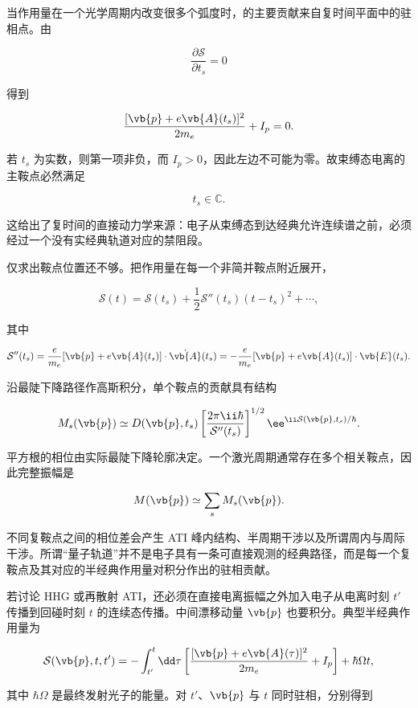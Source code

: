 当作用量在一个光学周期内改变很多个弧度时，的主要贡献来自复时间平面中的驻相点。由

\[
\frac{\partial \mathcal S}{\partial t_s}=0
\]

得到

\begin{equation}
\frac{[\vb{p}+e\vb{A}(t_s)]^2}{2m_e}+I_p=0.
\label{eq:sfa-saddle}
\end{equation}

若 \(t_s\) 为实数，则第一项非负，而 \(I_p>0\)，因此左边不可能为零。故束缚态电离的主鞍点必然满足

\[
t_s\in\mathbb C.
\]

这给出了复时间的直接动力学来源：电子从束缚态到达经典允许连续谱之前，必须经过一个没有实经典轨道对应的禁阻段。

仅求出鞍点位置还不够。把作用量在每一个非简并鞍点附近展开，

\[
\mathcal S(t)
=\mathcal S(t_s)
+\frac12\mathcal S''(t_s)(t-t_s)^2+\cdots,
\]

其中

\[
\mathcal S''(t_s)
=\frac{e}{m_e}[\vb{p}+e\vb{A}(t_s)]\cdot\dot{\vb{A}}(t_s)
=-\frac{e}{m_e}[\vb{p}+e\vb{A}(t_s)]\cdot\vb{E}(t_s).
\]

沿最陡下降路径作高斯积分，单个鞍点的贡献具有结构

\begin{equation}
M_s(\vb{p})
\simeq
D(\vb{p},t_s)
\left[
\frac{2\pi\ii\hbar}{\mathcal S''(t_s)}
\right]^{1/2}
 \ee^{\ii\mathcal S(\vb{p},t_s)/\hbar}.
\label{eq:sfa-saddle-prefactor}
\end{equation}

平方根的相位由实际最陡下降轮廓决定。一个激光周期通常存在多个相关鞍点，因此完整振幅是

\[
M(\vb{p})\simeq\sum_s M_s(\vb{p}).
\]

不同复鞍点之间的相位差会产生 ATI 峰内结构、半周期干涉以及所谓周内与周际干涉。所谓“量子轨道”并不是电子具有一条可直接观测的经典路径，而是每一个复鞍点及其对应的半经典作用量对积分作出的驻相贡献。

若讨论 HHG 或再散射 ATI，还必须在直接电离振幅之外加入电子从电离时刻 \(t'\) 传播到回碰时刻 \(t\) 的连续态传播。中间漂移动量 \(\vb{p}\) 也要积分。典型半经典作用量为

\[
\mathcal S(\vb{p},t,t')
=
-\int_{t'}^{t}\dd\tau
\left[
\frac{[\vb{p}+e\vb{A}(\tau)]^2}{2m_e}+I_p
\right]
+\hbar\Omega t,
\]

其中 \(\hbar\Omega\) 是最终发射光子的能量。对 \(t'\)、\(\vb{p}\) 与 \(t\) 同时驻相，分别得到

